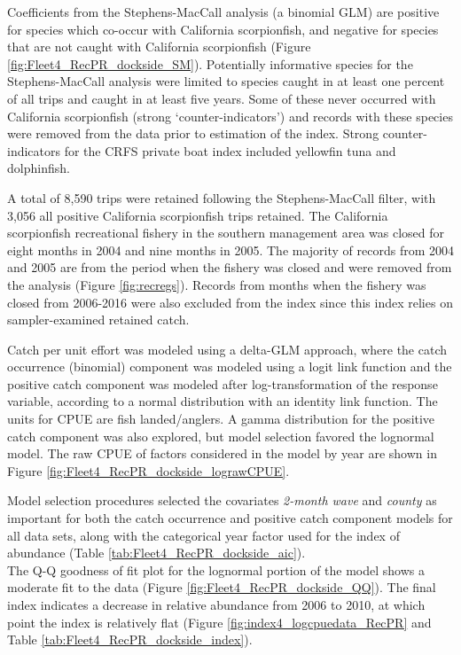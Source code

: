 \documentclass[12pt,]{article}
\begin{document}
Coefficients from the Stephens-MacCall analysis (a binomial GLM) are
positive for species which co-occur with California scorpionfish, and
negative for species that are not caught with California scorpionfish
(Figure \ref{fig:Fleet4_RecPR_dockside_SM}). Potentially informative
species for the Stephens-MacCall analysis were limited to species caught
in at least one percent of all trips and caught in at least five years.
Some of these never occurred with California scorpionfish (strong
`counter-indicators') and records with these species were removed from
the data prior to estimation of the index. Strong counter-indicators for
the CRFS private boat index included yellowfin tuna and dolphinfish.

A total of 8,590 trips were retained following the Stephens-MacCall
filter, with 3,056 all positive California scorpionfish trips retained.
The California scorpionfish recreational fishery in the southern
management area was closed for eight months in 2004 and nine months in
2005. The majority of records from 2004 and 2005 are from the period
when the fishery was closed and were removed from the analysis (Figure
\ref{fig:recregs}). Records from months when the fishery was closed from
2006-2016 were also excluded from the index since this index relies on
sampler-examined retained catch.

Catch per unit effort was modeled using a delta-GLM approach, where the
catch occurrence (binomial) component was modeled using a logit link
function and the positive catch component was modeled after
log-transformation of the response variable, according to a normal
distribution with an identity link function. The units for CPUE are fish
landed/anglers. A gamma distribution for the positive catch component
was also explored, but model selection favored the lognormal model. The
raw CPUE of factors considered in the model by year are shown in Figure
\ref{fig:Fleet4_RecPR_dockside_lograwCPUE}.

Model selection procedures selected the covariates \emph{2-month wave}
and \emph{county} as important for both the catch occurrence and
positive catch component models for all data sets, along with the
categorical year factor used for the index of abundance (Table
\ref{tab:Fleet4_RecPR_dockside_aic}).\\
The Q-Q goodness of fit plot for the lognormal portion of the model
shows a moderate fit to the data (Figure
\ref{fig:Fleet4_RecPR_dockside_QQ}). The final index indicates a
decrease in relative abundance from 2006 to 2010, at which point the
index is relatively flat (Figure \ref{fig:index4_logcpuedata_RecPR} and
Table \ref{tab:Fleet4_RecPR_dockside_index}).
\end{document}
